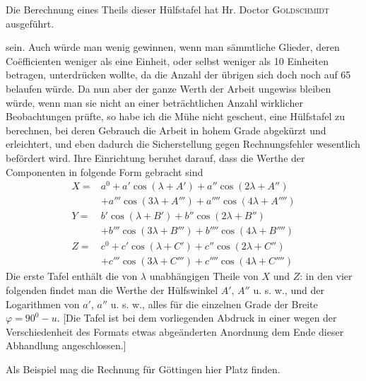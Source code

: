 \expandafter\def\csname HistoricalNoteText19\endcsname{Die Berechnung eines Theils dieser Hülfstafel hat Hr. Doctor \textsc{Goldschmidt} ausgeführt.}
\par\clearpage
{}
\noindent sein. Auch würde man wenig gewinnen, wenn man sämmtliche Glieder, deren Coëfficienten weniger als eine Einheit, oder selbst weniger als 10 Einheiten betragen, unterdrücken wollte, da die Anzahl der übrigen sich doch noch auf 65 belaufen würde. Da nun aber der ganze Werth der Arbeit ungewiss bleiben würde, wenn man sie nicht an einer beträchtlichen Anzahl wirklicher Beobachtungen prüfte, so habe ich die Mühe nicht gescheut, eine Hülfstafel zu berechnen, bei deren Gebrauch die Arbeit in hohem Grade abgekürzt und erleichtert, und eben dadurch die Sicherstellung gegen Rechnungsfehler wesentlich befördert wird. Ihre Einrichtung beruhet darauf, dass die Werthe der Componenten in folgende Form gebracht sind
\[
\begin{aligned}
X={}&a^0+a'\cos(\lambda+A')+a''\cos(2\lambda+A'')\\
&+a'''\cos(3\lambda+A''')+a''''\cos(4\lambda+A'''')\\
Y={}&b'\cos(\lambda+B')+b''\cos(2\lambda+B'')\\
&+b'''\cos(3\lambda+B''')+b''''\cos(4\lambda+B'''')\\
Z={}&c^0+c'\cos(\lambda+C')+c''\cos(2\lambda+C'')\\
&+c'''\cos(3\lambda+C''')+c''''\cos(4\lambda+C'''')
\end{aligned}
\]
Die erste Tafel enthält die von $\lambda$ unabhängigen Theile von $X$ und $Z$: in den vier folgenden findet man die Werthe der Hülfswinkel $A'$, $A''$ u. s. w., und der Logarithmen von $a'$, $a''$ u. s. w., alles für die einzelnen Grade der Breite $\varphi=90^0-u$. [Die Tafel ist bei dem vorliegenden Abdruck in einer wegen der Verschiedenheit des Formats etwas abgeänderten Anordnung dem Ende dieser Abhandlung angeschlossen.]

Als Beispiel mag die Rechnung für Göttingen hier Platz finden.

